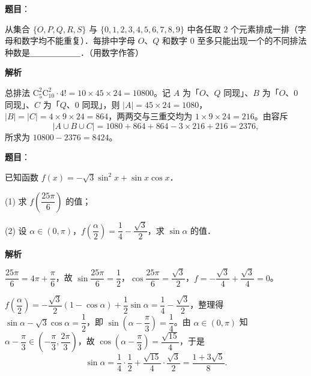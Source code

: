 \begin{answer}

\textbf{题目}：

从集合 $\{O, P, Q, R, S\}$ 与 $\{0, 1, 2, 3, 4, 5, 6, 7, 8, 9\}$ 中各任取 $2$ 个元素排成一排（字母和数字均不能重复）．每排中字母 $O$、$Q$ 和数字 $0$ 至多只能出现一个的不同排法种数是＿＿＿＿＿＿．（用数字作答）

\textbf{解析}

总排法 $\mathrm{C}_5^2\mathrm{C}_{10}^2 \cdot 4! = 10 \times 45 \times 24 = 10800$。记 $A$ 为「$O$、$Q$ 同现」、$B$ 为「$O$、$0$ 同现」、$C$ 为「$Q$、$0$ 同现」，则 $|A| = 45 \times 24 = 1080$，$|B| = |C| = 4 \times 9 \times 24 = 864$，两两交与三重交均为 $1 \times 9 \times 24 = 216$。由容斥
\nopagebreak[4]
\[
|A \cup B \cup C| = 1080 + 864 + 864 - 3 \times 216 + 216 = 2376,
\]
所求为 $10800 - 2376 = 8424$。


\end{answer}
\begin{answer}

\textbf{题目}：

已知函数 $f(x) = -\sqrt{3}\sin^2 x + \sin x\cos x$．

(1) 求 $f\left(\dfrac{25\pi}{6}\right)$ 的值；

(2) 设 $\alpha \in (0, \pi)$，$f\left(\dfrac{\alpha}{2}\right) = \dfrac{1}{4} - \dfrac{\sqrt{3}}{2}$，求 $\sin\alpha$ 的值．

\textbf{解析}


$\dfrac{25\pi}{6} = 4\pi + \dfrac{\pi}{6}$，故 $\sin\dfrac{25\pi}{6} = \dfrac{1}{2}$，$\cos\dfrac{25\pi}{6} = \dfrac{\sqrt{3}}{2}$，$f = -\dfrac{\sqrt{3}}{4} + \dfrac{\sqrt{3}}{4} = 0$。


$f\left(\dfrac{\alpha}{2}\right) = -\dfrac{\sqrt{3}}{2}(1 - \cos\alpha) + \dfrac{1}{2}\sin\alpha = \dfrac{1}{4} - \dfrac{\sqrt{3}}{2}$，整理得 $\sin\alpha - \sqrt{3}\cos\alpha = \dfrac{1}{2}$，即 $\sin\left(\alpha - \dfrac{\pi}{3}\right) = \dfrac{1}{4}$。由 $\alpha \in (0, \pi)$ 知 $\alpha - \dfrac{\pi}{3} \in \left(-\dfrac{\pi}{3}, \dfrac{2\pi}{3}\right)$，故 $\cos\left(\alpha - \dfrac{\pi}{3}\right) = \dfrac{\sqrt{15}}{4}$，于是
\nopagebreak[4]
\[
\sin\alpha = \frac{1}{4}\cdot\frac{1}{2} + \frac{\sqrt{15}}{4}\cdot\frac{\sqrt{3}}{2} = \frac{1 + 3\sqrt{5}}{8}.
\]



\end{answer}
